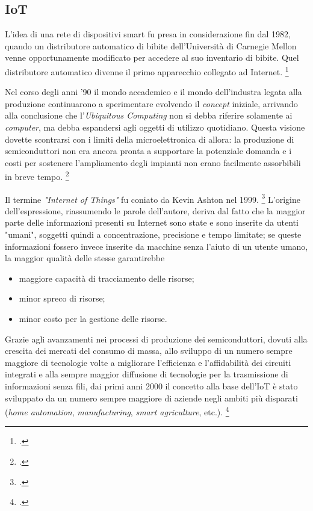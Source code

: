 \subsection{IoT}
\label{intro-iot}
L'idea di una rete di dispositivi smart fu presa in considerazione fin dal 1982, quando un distributore automatico di bibite dell'Università di Carnegie Mellon venne opportunamente modificato per accedere al suo inventario di bibite. Quel distributore automatico divenne il primo apparecchio collegato ad Internet.
\footcite{site:mellon-uni}

Nel corso degli anni '90 il mondo accademico e il mondo dell'industra legata alla produzione continuarono a sperimentare evolvendo il \textit{concept} iniziale, arrivando alla conclusione che l'\textit{Ubiquitous Computing} non si debba riferire solamente ai \textit{computer}, ma debba espandersi agli oggetti di utilizzo quotidiano. Questa visione dovette scontrarsi con i limiti della microelettronica di allora: la produzione di semiconduttori non era ancora pronta a supportare la potenziale domanda e i costi per sostenere l'ampliamento degli impianti non erano facilmente assorbibili in breve tempo.
\footcite{site:mit-weiser}

Il termine \textit{"Internet of Things"} fu coniato da Kevin Ashton nel 1999.
\footcite{site:iot-kashton}
L'origine dell'espressione, riassumendo le parole dell'autore, deriva dal fatto che la maggior parte delle informazioni presenti su Internet sono state e sono inserite da utenti "umani", soggetti quindi a concentrazione, precisione e tempo limitate;
se queste informazioni fossero invece inserite da macchine senza l'aiuto di un utente umano, la maggior qualità delle stesse garantirebbe
\begin{itemize}
  \item maggiore capacità di tracciamento delle risorse;
  \item minor spreco di risorse;
  \item minor costo per la gestione delle risorse.
\end{itemize} %


Grazie agli avanzamenti nei processi di produzione dei semiconduttori, dovuti alla crescita dei mercati del consumo di massa, allo sviluppo di un numero sempre maggiore di tecnologie volte a migliorare l'efficienza e l'affidabilità dei circuiti integrati e alla sempre maggior diffusione di tecnologie per la trasmissione di informazioni senza fili, dai primi anni 2000 il concetto alla base dell'IoT è stato sviluppato da un numero sempre maggiore di aziende negli ambiti più disparati (\textit{home automation}, \textit{manufacturing}, \textit{smart agriculture}, etc.).
\footcite{site:pc-to-things}


